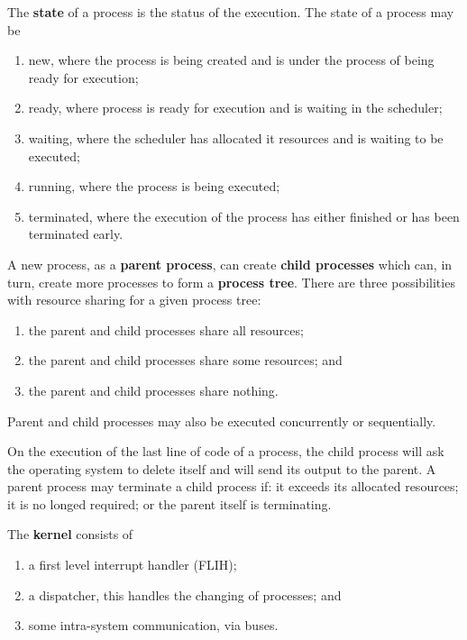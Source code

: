 \begin{definition} 
    The \textbf{state} of a process is the status of the execution. The state of a process may be
    
    \begin{enumerate}
        \item new, where the process is being created and is under the process of being ready for execution;
        
        \item ready, where process is ready for execution and is waiting in the scheduler;
        
        \item waiting, where the scheduler has allocated it resources and is waiting to be executed;
        
        \item running, where the process is being executed;
        
        \item terminated, where the execution of the process has either finished or has been terminated early.
    \end{enumerate}
\end{definition}

A new process, as a \textbf{parent process}, can create \textbf{child processes} which can, in turn, create more processes to form a \textbf{process tree}. There are three possibilities with resource sharing for a given process tree: 

\begin{enumerate}
    \item the parent and child processes share all resources;
    \item the parent and child processes share some resources; and
    \item the parent and child processes share nothing.
\end{enumerate}

Parent and child processes may also be executed concurrently or sequentially.

On the execution of the last line of code of a process, the child process will ask the operating system to delete itself and will send its output to the parent. A parent process may terminate a child process if: it exceeds its allocated resources; it is no longed required; or the parent itself is terminating.

\begin{definition}[Kernel] 
    The \textbf{kernel} consists of
    
    \begin{enumerate}
        \item a first level interrupt handler (FLIH);
        \item a dispatcher, this handles the changing of processes; and
        \item some intra-system communication, via buses. %
    \end{enumerate}
\end{definition}

